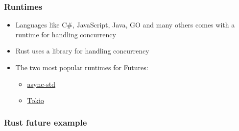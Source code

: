 \begin{frame}[fragile]
    \frametitle{Runtimes}
    \begin{itemize}
        \item Languages like C#, JavaScript, Java, GO and many others comes with a runtime for handling concurrency
        \item Rust uses a library for handling concurrency

        \item The two most popular runtimes for Futures:
    	\begin{itemize}
    	    \item \href{https://github.com/async-rs/async-std}{async-std}
    	    \item \href{https://github.com/tokio-rs/tokio}{Tokio}
    	\end{itemize}
    \end{itemize}
% 
% 
% 
\end{frame}
\begin{frame}[fragile]
    \frametitle{Rust future example}
% 
% 
% 
% 
% 
% 
\end{frame}
